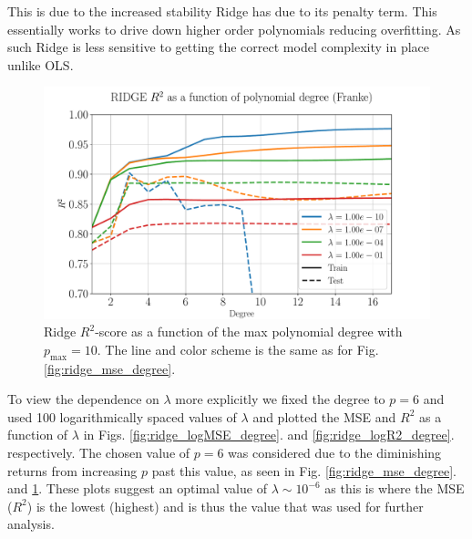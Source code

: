 \documentclass[%
reprint,
amsmath,amssymb,
aps,
pra,
]{revtex4-2}
\begin{document}
This is due to the increased stability Ridge has due to its penalty term. This essentially works to drive down higher order polynomials reducing overfitting. As such Ridge is less sensitive to getting the correct model complexity in place unlike OLS.
\begin{figure}[ht!]
	\centering
	\includegraphics[width=\linewidth]{Python/Figures/Ridge/RIDGE_R2_Unscaled.pdf}
	\caption{Ridge $R^2$-score as a function of the max polynomial degree with \(p_{\text{max}}=10\). The line and color scheme is the same as for Fig. \ref{fig:ridge_mse_degree}.}
	\label{fig:ridge_r2_degree}
\end{figure}

To view the dependence on $\lambda$ more explicitly we fixed the degree to \(p=6\) and used 100 logarithmically spaced values of $\lambda$ and plotted the MSE and $R^2$ as a function of $\lambda$ in Figs. \ref{fig:ridge_logMSE_degree}. and \ref{fig:ridge_logR2_degree}. respectively. The chosen value of $p=6$ was considered due to the diminishing returns from increasing \(p\) past this value, as seen in Fig. \ref{fig:ridge_mse_degree}. and \ref{fig:ridge_r2_degree}. These plots suggest an optimal value of $\lambda\sim 10^{-6}$ as this is where the MSE ($R^2$) is the lowest (highest) and is thus the value that was used for further analysis.
\end{document}
